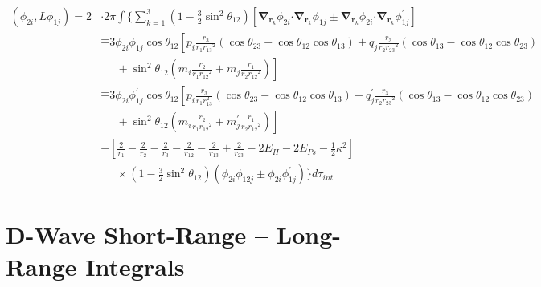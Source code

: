 \documentclass[Dissertation.tex]{subfiles}
\begin{document}
\begin{align}
\label{eq:DWavePhi2Phi1}
\left(\bar{\phi}_{2i},L \bar{\phi}_{1j}\right) = 2 & \cdot 2\pi \int \Bigg\{ \sum_{k=1}^3 \left(1-\tfrac{3}{2}\sin^2\theta_{12}\right) \left[ \boldsymbol{\nabla}_{\!\mathbf{r}_k} \nonumber \phi_{2i} \boldsymbol{\cdot} \boldsymbol{\nabla}_{\!\mathbf{r}_k} \phi_{1j} \pm \boldsymbol{\nabla}_{\!\mathbf{r}_k} \phi_{2i} \boldsymbol{\cdot} \boldsymbol{\nabla}_{\!\mathbf{r}_k} \phi_{1j}^\prime \right] \\
 \nonumber &\mp 3 \phi_{2i} \phi_{1j} \cos\theta_{12} \left[p_i \frac{r_3}{r_1 {r_{13}}^2} (\cos\theta_{23} - \cos\theta_{12} \cos\theta_{13}) + q_j \frac{r_3}{r_2 {r_{23}}^2}(\cos\theta_{13} - \cos\theta_{12} \cos\theta_{23})\right.\\
 \nonumber & \left. \;\;\;\;\;  + \sin^2\theta_{12} \left(m_i \frac{r_2}{r_1 {r_{12}}^2} + m_j \frac{r_1}{r_2 {r_{12}}^2} \right) \right] \\
 \nonumber &\mp 3 \phi_{2i} \phi_{1j}^\prime \cos\theta_{12} \left[p_i \frac{r_3}{r_1 r_{13}^2} (\cos\theta_{23} - \cos\theta_{12} \cos\theta_{13}) + q_j^\prime \frac{r_3}{r_2 {r_{23}}^2}(\cos\theta_{13} - \cos\theta_{12} \cos\theta_{23})\right.\\
 \nonumber & \left. \;\;\;\;\;  + \sin^2\theta_{12} \left(m_i \frac{r_2}{r_1 {r_{12}}^2} + m_j^\prime \frac{r_1}{r_2 {r_{12}}^2} \right) \right] \\
 \nonumber &+ \left. \left[\frac{2}{r_1} - \frac{2}{r_2} - \frac{2}{r_3} - \frac{2}{r_{12}} - \frac{2}{r_{13}} + \frac{2}{r_{23}} - 2 E_H - 2 E_{Ps} - \frac{1}{2}\kappa^2 \right] \right. \\
 &\;\;\;\;\; \times \left(1-\tfrac{3}{2}\sin^2\theta_{12}\right) \left( \phi_{2i} \phi_{12j} \pm \phi_{2i} \phi_{1j}^\prime \right) \Bigg\} d\tau_{int}
\end{align}




\section{D-Wave Short-Range -- Long-Range Integrals}
\label{sec:DWaveShortLong}
\end{document}
